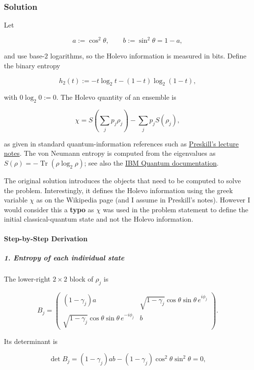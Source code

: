 \subsubsection*{Solution}
Let

\[
a:=\cos ^2\theta,\qquad b:=\sin ^2\theta=1-a,
\]

and use base-$2$ logarithms, so the Holevo information is measured in bits. Define the binary entropy

\[
h_2(t):=-t\log_2t-(1-t)\log_2(1-t),
\]

with $0\log_2 0:=0$. The Holevo quantity of an ensemble is

\[
\chi=S\left(\sum_jp_j\rho_j\right)-\sum_jp_jS(\rho_j),
\]

as given in standard quantum-information references such as \href{\detokenize{https://www.preskill.caltech.edu/ph229/notes/chap5.pdf}}{Preskill's lecture notes}. The von Neumann entropy is computed from the eigenvalues as $S(\rho)=-\operatorname{Tr}(\rho\log_2\rho)$; see also the \href{\detokenize{https://quantum.cloud.ibm.com/docs/api/qiskit/0.45/quantum_info}}{IBM Quantum documentation}.

{
\color{blue}
The original solution introduces the objects that need to be computed to solve the problem. Interestingly, it defines the Holevo information using the greek variable $\chi$ as on the Wikipedia page (and I assume in Preskill's notes). However I would consider this a \textbf{typo} as $\chi$ was used in the problem statement to define the initial classical-quantum state and not the Holevo information. 

}

\paragraph*{Step-by-Step Derivation}

\subparagraph*{1. Entropy of each individual state}

The lower-right $2\times2$ block of $\rho_j$ is

\[
B_j=
\begin{pmatrix}
(1-\gamma_j)a &
\sqrt{1-\gamma_j}\cos\theta\sin\theta\,e^{i\phi_j}\\
\sqrt{1-\gamma_j}\cos\theta\sin\theta\,e^{-i\phi_j}&b
\end{pmatrix}.
\]

Its determinant is

\[
\det B_j =(1-\gamma_j)ab -(1-\gamma_j)\cos^2\theta\sin^2\theta =0,
\]

